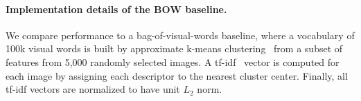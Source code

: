 \documentclass[table]{article} %
\begin{document}
    
	    
	    \vspace{-4mm}
	   	\paragraph{Implementation details of the BOW baseline.}	
		We compare performance to a bag-of-visual-words baseline, where
	    	a vocabulary of 100k visual words is built by approximate k-means clustering~\cite{Philbin07} from a subset of features from 5,000 randomly selected images. A tf-idf~\cite{Sivic03} vector is computed for each image by assigning each descriptor to the nearest cluster center.  Finally, all tf-idf vectors are normalized to have unit $L_2$ norm.

%
%
\end{document}
